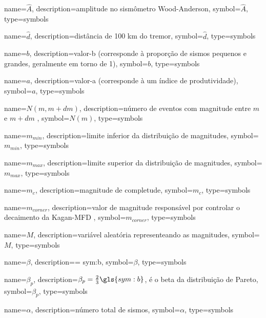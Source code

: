 {
	name={\ensuremath{\hat{A}}},
	description={amplitude no sismômetro Wood-Anderson},
	symbol={\ensuremath{\hat{A}}},
	type=symbols
}

{
	name={\ensuremath{\hat{d}}},
	description={distância de 100 km do tremor},
	symbol={\ensuremath{\hat{d}}},
	type=symbols
}


{
	name={\ensuremath{b}},
	description={valor-b (corresponde à proporção de sismos pequenos e grandes, geralmente em torno de 1)},
	symbol={\ensuremath{b}},
	type=symbols
}


{
	name={\ensuremath{a}},
	description={valor-a (corresponde à um índice de produtividade)},
	symbol={\ensuremath{a}},
	type=symbols
}


{
	name={\ensuremath{N(m,m+dm)}},
	description={número de eventos com magnitude entre $m$ e $m + dm$ },
	symbol={\ensuremath{N(m)}},
	type=symbols
}


{
	name={\ensuremath{m_{min}}},
	description={limite inferior da distribuição de magnitudes},
	symbol={\ensuremath{m_{min}}},
	type=symbols
}

{
	name={\ensuremath{m_{max}}},
	description={limite superior da distribuição de magnitudes},
	symbol={\ensuremath{m_{max}}},
	type=symbols
}

{
	name={\ensuremath{m_c}},
	description={magnitude de completude},
	symbol={\ensuremath{m_c}},
	type=symbols
}

{
	name={\ensuremath{m_{corner}}},
	description={valor de magnitude responsável por controlar o decaimento da Kagan-MFD },
	symbol={\ensuremath{m_{corner}}},
	type=symbols
}

{
	name={\ensuremath{M}},
	description={variável aleatória representeando as magnitudes},
	symbol={\ensuremath{M}},
	type=symbols
}

{
	name={\ensuremath{\beta}},
	description={\beta = \gls{sym:b}},
	symbol={\ensuremath{\beta}},
	type=symbols
}

{
	name={\ensuremath{\beta_p}},
	description={$\beta_p = \frac{2}{3}\gls{sym:b}$, é o beta da distribuição de Pareto},
	symbol={\ensuremath{\beta_p}},
	type=symbols
}

{
	name={\ensuremath{\alpha}},
	description={número total de sismos},
	symbol={\ensuremath{\alpha}},
	type=symbols
}


